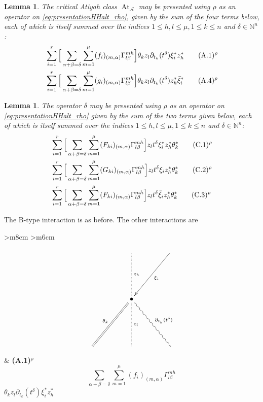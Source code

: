 \documentclass[english,letter paper,12pt,leqno]{article}
\newtheorem{lemma}[theorem]{Lemma}
\theoremstyle{example}
\numberwithin{equation}{section}
\def\AA{\mathcal{A}}
\DeclareMathOperator{\vAt}{At}
\begin{document}
\begin{lemma}
The critical Atiyah class $\vAt_{\AA}$ may be presented using $\rho$ as an operator on \eqref{eq:presentationHHalt_rho}, given by the sum of the four terms below, each of which is itself summed over the indices $1 \le h,l \le \mu, 1 \le k \le n$ and $\delta \in \mathbb{N}^n$:
\begin{align}
&\sum_{i=1}^r \Big[ \sum_{\alpha + \beta = \delta } \sum_{m=1}^\mu (f_i)_{(m,\alpha)} \Gamma^{mh}_{l\beta} \Big] \theta_k z_l \partial_{t_k}(t^\delta) \xi_i^* z_h^*  \qquad (\textup{A}.1)^\rho \label{eq:a3vertex_rho}\\
&\sum_{i=1}^r \Big[ \sum_{\alpha + \beta = \delta } \sum_{m=1}^\mu (g_i)_{(m,\alpha)} \Gamma^{mh}_{l\beta} \Big] \theta_k z_l \partial_{t_k}(t^\delta) z_h^* \Bar{\xi}_i^* \qquad (\textup{A}.4)^\rho \label{eq:a4vertex_rho}
\end{align}
\end{lemma}

\begin{lemma}
The operator $\delta$ may be presented using $\rho$ as an operator on \eqref{eq:presentationHHalt_rho} given by the sum of the two terms given below, each of which is itself summed over the indices $1 \le h,l \le \mu, 1 \le k \le n$ and $\delta \in \mathbb{N}^n$:
\begin{align}
& \sum_{i=1}^r \Big[ \sum_{\alpha + \beta = \delta } \sum_{m=1}^\mu (F_{ki})_{(m,\alpha)} \Gamma^{m h}_{l \beta} \Big] z_{l} t^\delta \xi_i^* z_h^* \theta_k^* \qquad (\textup{C}.1)^\rho\label{eq:c1vertex_rho}\\
& \sum_{i=1}^r \Big[ \sum_{\alpha + \beta = \delta } \sum_{m=1}^\mu (G_{ki})_{(m,\alpha)} \Gamma^{m h}_{l \beta} \Big] z_{l} t^\delta \xi_i z_h^* \theta_k^* \qquad (\textup{C}.2)^\rho\label{eq:c2vertex_rho}\\
& \sum_{i=1}^r \Big[ \sum_{\alpha + \beta = \delta } \sum_{m=1}^\mu (F_{ki})_{(m,\alpha)} \Gamma^{m h}_{l \beta} \Big] z_{l} t^\delta \Bar{\xi}_i z_h^* \theta_k^* \qquad (\textup{C}.3)^\rho\label{eq:c3vertex_rho}
\end{align}
\end{lemma}

The B-type interaction is as before. The other interactions are

\begin{center}
\begin{tabular}{ >{\centering}m{8cm} >{\centering}m{6cm} }
\[
\xymatrix@C+2pc@R+3pc{
& & \ar@{.}[d]^-{z_h} & \ar[dl]^-{\xi_i}\\
& & \bullet \ar@{=}[dl]_-{\theta_k} \ar@{.}[d]^-{z_l} \ar@{~}[dr]^-{\partial_{t_k}(t^\delta)}\\
& & & & 
}
\]
&
\textbf{(A.1)${}^\rho$}
\vspace{1cm}
\[\sum_{\alpha + \beta = \delta } \sum_{m=1}^\mu (f_i)_{(m,\alpha)} \Gamma^{mh}_{l\beta}\]
\vspace{0.5cm}
$\theta_k z_l \partial_{t_k}(t^\delta) \xi_i^* z_h^*$
\end{tabular}
\end{center}
\end{document}
